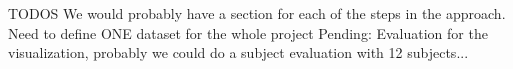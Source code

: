 TODOS
We would probably have a section for each of the steps in the approach. 
Need to define ONE dataset for the whole project
Pending: Evaluation for the visualization, probably we could do a subject evaluation with 12 subjects...